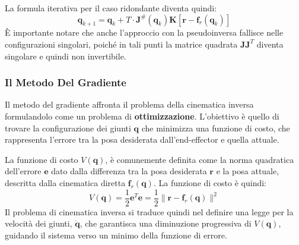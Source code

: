 ﻿\documentclass[11pt, a4paper]{article}
\begin{document}
La formula iterativa per il caso ridondante diventa quindi:
\[
    \bm{q}_{k+1} = \bm{q}_k + T \cdot \bm{J}^{\#}(\bm{q}_k) \bm{K} \left[ \bm{r} - \bm{f}_r(\bm{q}_k) \right]
\]
È importante notare che anche l'approccio con la pseudoinversa fallisce nelle configurazioni singolari, poiché in tali punti la matrice quadrata \(\bm{J}\bm{J}^T\) diventa singolare e quindi non invertibile.

\newpage
\subsubsection{Il Metodo Del Gradiente}
Il metodo del gradiente affronta il problema della cinematica inversa formulandolo come un problema di \textbf{ottimizzazione}. L'obiettivo è quello di trovare la configurazione dei giunti \(\bm{q}\) che minimizza una funzione di costo, che rappresenta l'errore tra la posa desiderata dall'end-effector e quella attuale.

La funzione di costo \(V(\bm{q})\), è comunemente definita come la norma quadratica dell'errore \(\bm{e}\) dato dalla differenza tra la posa desiderata \(\bm{r}\) e la posa attuale, descritta dalla cinematica diretta \(\bm{f}_r(\bm{q})\). La funzione di costo è quindi:
\[
    V(\bm{q}) = \frac{1}{2} \bm{e}^T \bm{e} = \frac{1}{2} \| \bm{r} - \bm{f}_r(\bm{q}) \|^2
\]
Il problema di cinematica inversa si traduce quindi nel definire una legge per la velocità dei giunti, \(\dot{\bm{q}}\), che garantisca una diminuzione progressiva di \(V(\bm{q})\), guidando il sistema verso un minimo della funzione di errore.
\end{document}
